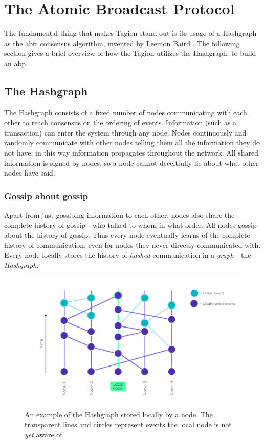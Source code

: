 \section{The Atomic Broadcast Protocol}
    The fundamental thing that makes Tagion stand out is its usage of a Hashgraph as the \gls{abft} consensus algorithm, invented by Leemon Baird \cite{SWIRLDS_HASHGRAPH}. The following section gives a brief overview of how the Tagion utilizes the Hashgraph, to build an \gls{abp}.

\subsection{The Hashgraph}
    The Hashgraph consists of a fixed number of nodes communicating with each other to reach consensus on the ordering of events. Information (such as a transaction) can enter the system through any node. Nodes continuously and randomly communicate with other nodes telling them all the information they do not have; in this way information propagates throughout the network. All shared information is signed by nodes, so a node cannot deceitfully lie about what other nodes have said. 

\subsubsection{Gossip about gossip}
    Apart from just gossiping information to each other, nodes also share the complete history of gossip - who talked to whom in what order. All nodes gossip about the history of gossip. Thus every node eventually learns of the complete history of communication; even for nodes they never directly communicated with. Every node locally stores the history of \textit{hashed} communication in a \textit{graph} - the \textit{Hashgraph}.

    \begin{figure}[H]
        \centering
        \includegraphics[width=1\textwidth]{figures/hashgraph_example.png}
        \caption{An example of the Hashgraph stored locally by a node. The transparent lines and circles represent events the local node is not \textit{yet} aware of.}
        \label{fig:hashgraph_example}
    \end{figure}


